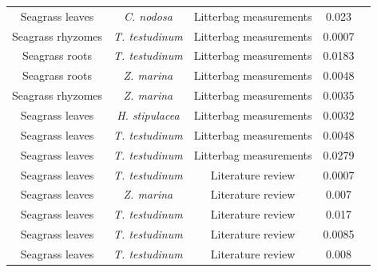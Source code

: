 \begin{table}[htbp]
\begin{tabular}{ccccc}
    \multicolumn{1}{c}{Seagrass leaves} & \textit{C. nodosa} & Litterbag measurements & 0.023 & \citealt{Kenworthy:1984vc}   \\

    \multicolumn{1}{c}{Seagrass rhyzomes} & \textit{T. testudinum} & Litterbag measurements & 0.0007 & \citealt{Kenworthy:1984vc}   \\

    \multicolumn{1}{c}{Seagrass roots} & \textit{T. testudinum} & Litterbag measurements & 0.0183 & \citealt{Kenworthy:1984vc}   \\

    \multicolumn{1}{c}{Seagrass roots} & \textit{Z. marina} & Litterbag measurements & 0.0048 & \citealt{Kenworthy:1984vc}  \\

    \multicolumn{1}{c}{Seagrass rhyzomes} & \textit{Z. marina} & Litterbag measurements & 0.0035 & \citealt{Kenworthy:1984vc}  \\


    \multicolumn{1}{c}{Seagrass leaves} & \textit{H. stipulacea} & Litterbag measurements & 0.0032 & \citealt{Wahbeh:1985vf}  \\

    \multicolumn{1}{c}{Seagrass leaves} & \textit{T. testudinum} & Litterbag measurements & 0.0048 & \citealt{Newell:1984wl} \\

    \multicolumn{1}{c}{Seagrass leaves} & \textit{T. testudinum} & Litterbag measurements & 0.0279 & \citealt{Newell:1984wl}  \\

    \multicolumn{1}{c}{Seagrass leaves} & \textit{T. testudinum} & Literature review & 0.0007 & \citealt{Harrison:1989tp} \\

    \multicolumn{1}{c}{Seagrass leaves} & \textit{Z. marina} & Literature review & 0.007 & \citealt{Harrison:1989tp} \\

    \multicolumn{1}{c}{Seagrass leaves} & \textit{T. testudinum} & Literature review & 0.017 & \citealt{Harrison:1989tp} \\

    \multicolumn{1}{c}{Seagrass leaves} & \textit{T. testudinum} & Literature review & 0.0085 & \citealt{Harrison:1989tp} \\

    \multicolumn{1}{c}{Seagrass leaves} & \textit{T. testudinum} & Literature review & 0.008 & \citealt{Harrison:1989tp} \\


\end{tabular}
\end{table}
